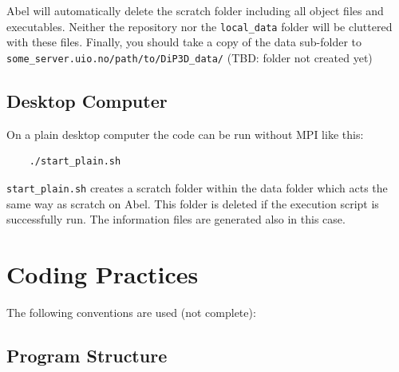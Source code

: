 \documentclass[10pt,a4paper]{article}
\begin{document}
Abel will automatically delete the scratch folder including all object files and executables. Neither the repository nor the \lstinline$local_data$ folder will be cluttered with these files. Finally, you should take a copy of the data sub-folder to \lstinline$some_server.uio.no/path/to/DiP3D_data/$ (TBD: folder not created yet)

\subsection{Desktop Computer}
On a plain desktop computer the code can be run without MPI like this:

\begin{lstlisting}
	./start_plain.sh
\end{lstlisting}

\lstinline$start_plain.sh$ creates a scratch folder within the data folder which acts the same way as scratch on Abel. This folder is deleted if the execution script is successfully run. The information files are generated also in this case.

\section{Coding Practices}
The following conventions are used (not complete):

\subsection{Program Structure}
\end{document}
